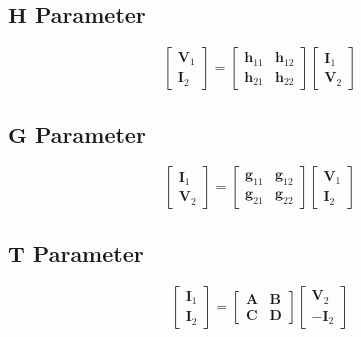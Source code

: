 	\subsection*{$\mathbf{H}$ Parameter} \label{subsec:H Parameter}
		\begin{equation*} \label{eq:H Parameter}
			\begin{bmatrix}
				\mathbf{V}_{1} \\
				\mathbf{I}_{2} 
			\end{bmatrix}
			=\begin{bmatrix}
				\mathbf{h}_{11} & \mathbf{h}_{12} \\
				\mathbf{h}_{21} & \mathbf{h}_{22}
			\end{bmatrix}
			\begin{bmatrix}
				\mathbf{I}_{1} \\
				\mathbf{V}_{2} 
			\end{bmatrix}
		\end{equation*}


	\subsection*{$\mathbf{G}$ Parameter} \label{subsec:G Parameter}
		\begin{equation*} \label{eq:G Parameter}
			\begin{bmatrix}
				\mathbf{I}_{1} \\
				\mathbf{V}_{2} 
			\end{bmatrix}
			=\begin{bmatrix}
				\mathbf{g}_{11} & \mathbf{g}_{12} \\
				\mathbf{g}_{21} & \mathbf{g}_{22}
			\end{bmatrix}
			\begin{bmatrix}
				\mathbf{V}_{1} \\
				\mathbf{I}_{2} 
			\end{bmatrix}
		\end{equation*}
	
	\subsection*{$\mathbf{T}$ Parameter} \label{subsec:T Parameter}
		\begin{equation*} \label{eq:T Parameter}
			\begin{bmatrix}
				\mathbf{I}_{1} \\
				\mathbf{I}_{2} 
			\end{bmatrix}
			=\begin{bmatrix}
				\mathbf{A} & \mathbf{B} \\
				\mathbf{C} & \mathbf{D}
			\end{bmatrix}
			\begin{bmatrix}
				\mathbf{V}_{2} \\
				\mathbf{-I}_{2} 
			\end{bmatrix}
	\end{equation*}
	
